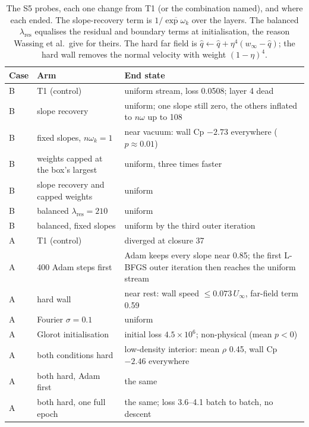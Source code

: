 \documentclass[11pt]{article}
\begin{document}
\begin{table}[t]
\centering\small
\caption{The S5 probes, each one change from T1 (or the combination named), and where each ended.
The slope-recovery term is $1/\overline{\exp\omega_k}$ over the layers. The balanced
$\lambda_{\mathrm{res}}$ equalises the residual and boundary terms at initialisation, the reason
Wassing et al.\ give for theirs. The hard far field is $\hat q \leftarrow \hat q + \eta^4(w_\infty -
\hat q)$; the hard wall removes the normal velocity with weight $(1-\eta)^4$.}
\label{tab:s5probes}
\begin{tabularx}{\textwidth}{@{}ll>{\raggedright\arraybackslash}X@{}}
\toprule
Case & Arm & End state\\
\midrule
B & T1 (control) & uniform stream, loss 0.0508; layer 4 dead\\
B & slope recovery & uniform; one slope still zero, the others inflated to $n\omega$ up to 108\\
B & fixed slopes, $n\omega_k = 1$ & near vacuum: wall Cp $-2.73$ everywhere ($p\approx0.01$)\\
B & weights capped at the box's largest & uniform, three times faster\\
B & slope recovery and capped weights & uniform\\
B & balanced $\lambda_{\mathrm{res}} = 210$ & uniform\\
B & balanced, fixed slopes & uniform by the third outer iteration\\
\addlinespace
A & T1 (control) & diverged at closure 37\\
A & 400 Adam steps first & Adam keeps every slope near 0.85; the first L-BFGS outer iteration
  then reaches the uniform stream\\
A & hard wall & near rest: wall speed $\le 0.073\,U_\infty$, far-field term 0.59\\
A & Fourier $\sigma = 0.1$ & uniform\\
A & Glorot initialisation & initial loss $4.5\times10^6$; non-physical (mean $p<0$)\\
A & both conditions hard & low-density interior: mean $\rho$ 0.45, wall Cp $-2.46$ everywhere\\
A & both hard, Adam first & the same\\
A & both hard, one full epoch & the same; loss 3.6--4.1 batch to batch, no descent\\
\bottomrule
\end{tabularx}
\end{table}
\end{document}
